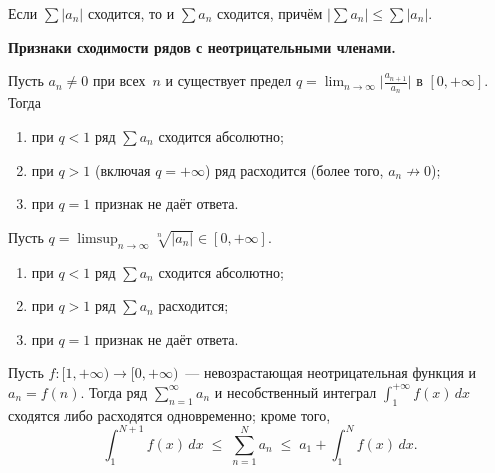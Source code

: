 \begin{theorem}
\label{thm:abs-implies-conv}
Если $\sum |a_n|$ сходится, то и $\sum a_n$ сходится, причём
$\bigl|\sum a_n\bigr| \le \sum |a_n|$.
\end{theorem}

\medskip

\noindent\textbf{Признаки сходимости рядов с неотрицательными
членами.}

\begin{theorem}
\label{thm:dalembert}
Пусть $a_n \neq 0$ при всех~$n$ и существует предел
$q = \lim_{n \to \infty} \bigl|\tfrac{a_{n+1}}{a_n}\bigr|$ в
$[0, +\infty]$. Тогда
\begin{enumerate}[label=(\alph*)]
  \item при $q < 1$ ряд $\sum a_n$ сходится абсолютно;
  \item при $q > 1$ (включая $q = +\infty$) ряд расходится
        (более того, $a_n \not\to 0$);
  \item при $q = 1$ признак не даёт ответа.
\end{enumerate}
\end{theorem}

\begin{theorem}
\label{thm:cauchy-root}
Пусть $q = \limsup_{n \to \infty} \sqrt[n]{|a_n|} \in [0, +\infty]$.
\begin{enumerate}[label=(\alph*)]
  \item при $q < 1$ ряд $\sum a_n$ сходится абсолютно;
  \item при $q > 1$ ряд $\sum a_n$ расходится;
  \item при $q = 1$ признак не даёт ответа.
\end{enumerate}
\end{theorem}

\begin{theorem}
\label{thm:integral-test}
Пусть $f \colon [1, +\infty) \to [0, +\infty)$~--- невозрастающая
неотрицательная функция и $a_n = f(n)$. Тогда ряд
$\sum_{n=1}^{\infty} a_n$ и несобственный интеграл
$\int_1^{+\infty} f(x)\, dx$ сходятся либо расходятся одновременно;
кроме того,
\[
  \int_{1}^{N+1} f(x)\, dx \;\le\; \sum_{n=1}^{N} a_n \;\le\; a_1 + \int_{1}^{N} f(x)\, dx.
\]
\end{theorem}

\medskip

